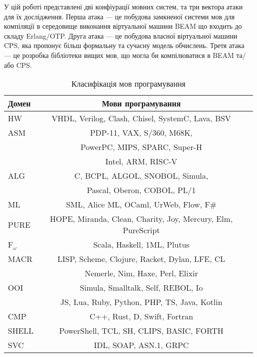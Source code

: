 У цій роботі представлені дві конфіурації мовних систем, та три вектора атаки для їх дослідження.
Перша атака --- це побудова замкненої системи мов для компіляції в середовище виконання віртуальної машини BEAM що входить до складу Erlang/OTP.
Друга атака --- це побудова власної віртуальної машини CPS, яка пропонує більш формальну та сучасну модель обчислень.
Третя атака --- це розробка бібліотеки вищих мов, що могла би компілюватися в BEAM та/або CPS.

\begin{table}[ht]
 \caption{Класифікація мов програмування}
  \begin{tabular}{lcc}
   \hline
\rowcolor{ZimaBlue}
       \textbf{Домен} & \textbf{Мови програмування} \\
    \hline
       HW & VHDL, Verilog, Clash, Chisel, SystemC, Lava, BSV \\
    \hline
\rowcolor{LightGray25}
       ASM & PDP-11, VAX, S/360, M68K,  \\
\rowcolor{LightGray25}
           & PowerPC, MIPS, SPARC, Super-H \\
\rowcolor{LightGray25}
           & Intel, ARM, RISC-V \\
    \hline
       ALG & C, BCPL, ALGOL, SNOBOL, Simula, \\
           & Pascal, Oberon, COBOL, PL/1 \\
    \hline
\rowcolor{LightGray}
       ML & SML, Alice ML, OCaml, UrWeb, Flow, F\# \\
    \hline
\rowcolor{LightGray}
       PURE & HOPE, Miranda, Clean, Charity, Joy, Mercury, Elm, PureScript \\
    \hline
\rowcolor{LightGray}
       F$_\omega$ & Scala, Haskell, 1ML, Plutus \\
    \hline
\rowcolor{LightGray25}
       MACR & LISP, Scheme, Clojure, Racket, Dylan, LFE, CL \\
\rowcolor{LightGray25}
            & Nemerle, Nim, Haxe, Perl, Elixir \\
    \hline
\rowcolor{LightGray25}
       OOI & Simula, Smalltalk, Self, REBOL, Io \\
\rowcolor{LightGray25}
           & JS, Lua, Ruby, Python, PHP, TS, Java, Kotlin \\
    \hline
\rowcolor{LightGray25}
       CMP & C++, Rust, D, Swift, Fortran \\
    \hline
       SHELL & PowerShell, TCL, SH, CLIPS, BASIC, FORTH \\
    \hline
       SVC & IDL, SOAP, ASN.1, GRPC \\

\end{tabular}
\end{table}

